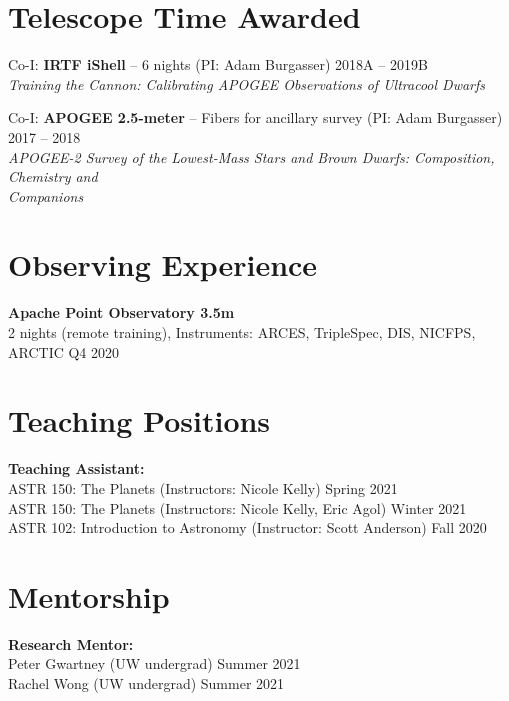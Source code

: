 \documentclass[margin,line]{resume}
\begin{document}
\begin{resume}

\section{\mysidestyle \textcolor{bcolor}{Telescope Time Awarded}}
Co-I: \textbf{IRTF iShell} -- 6 nights (PI: Adam Burgasser) \hfill 2018A -- 2019B \\ 
\textsl{Training the Cannon: Calibrating APOGEE Observations of Ultracool Dwarfs} 

Co-I: \textbf{APOGEE 2.5-meter} -- Fibers for ancillary survey (PI: Adam Burgasser) \hfill 2017 -- 2018 \\
\textsl{APOGEE-2 Survey of the Lowest-Mass Stars and Brown Dwarfs: Composition, Chemistry and \\ Companions}



\section{\mysidestyle \textcolor{bcolor}{Observing Experience}}
\textbf{Apache Point Observatory 3.5m}  \\
2 nights (remote training), Instruments: ARCES, TripleSpec, DIS, NICFPS, ARCTIC \hfill Q4 2020


\section{\mysidestyle \textcolor{bcolor}{Teaching Positions}}
\textbf{Teaching Assistant:} \\
ASTR 150: The Planets (Instructors: Nicole Kelly) \hfill Spring 2021  \\
ASTR 150: The Planets (Instructors: Nicole Kelly, Eric Agol) \hfill Winter 2021  \\
ASTR 102: Introduction to Astronomy (Instructor: Scott Anderson) \hfill Fall 2020 


\section{\mysidestyle \textcolor{bcolor}{Mentorship}}
\textbf{Research Mentor:} \\
Peter Gwartney (UW undergrad) \hfill Summer 2021 \\
Rachel Wong (UW undergrad) \hfill Summer 2021 


\end{resume}
\end{document}
